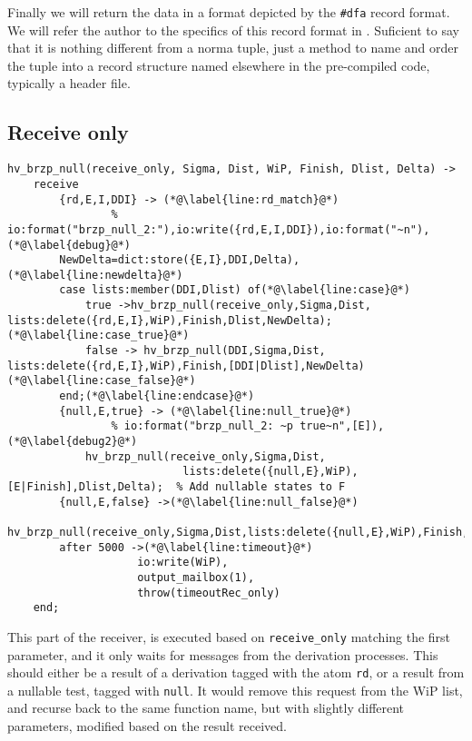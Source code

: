 Finally we will return the data in a format depicted by the
\texttt{\#dfa} record format. We will refer the author to the specifics
of this record format in \cite{Armstrong}. Suficient to say that it is
nothing different from a norma tuple, just a method to name and order
the tuple into a record structure named elsewhere in the pre-compiled
code, typically a header file.

\subsection{Receive only}
\label{sec:receive}

\begin{lstlisting}[name=hvp2]
%Receive only, nothing to derive
hv_brzp_null(receive_only, Sigma, Dist, WiP, Finish, Dlist, Delta) ->
	receive
		{rd,E,I,DDI} -> (*@\label{line:rd_match}@*)
                % io:format("brzp_null_2:"),io:write({rd,E,I,DDI}),io:format("~n"),(*@\label{debug}@*)
		NewDelta=dict:store({E,I},DDI,Delta),(*@\label{line:newdelta}@*)
		case lists:member(DDI,Dlist) of(*@\label{line:case}@*)
			true ->hv_brzp_null(receive_only,Sigma,Dist, lists:delete({rd,E,I},WiP),Finish,Dlist,NewDelta);(*@\label{line:case_true}@*)
			false -> hv_brzp_null(DDI,Sigma,Dist, lists:delete({rd,E,I},WiP),Finish,[DDI|Dlist],NewDelta)(*@\label{line:case_false}@*)
		end;(*@\label{line:endcase}@*)
		{null,E,true} -> (*@\label{line:null_true}@*)
                % io:format("brzp_null_2: ~p true~n",[E]), (*@\label{debug2}@*)
			hv_brzp_null(receive_only,Sigma,Dist,
                           lists:delete({null,E},WiP),[E|Finish],Dlist,Delta);	% Add nullable states to F
		{null,E,false} ->(*@\label{line:null_false}@*)
			hv_brzp_null(receive_only,Sigma,Dist,lists:delete({null,E},WiP),Finish,Dlist,Delta)
		after 5000 ->(*@\label{line:timeout}@*)
                    io:write(WiP),
                    output_mailbox(1),
                    throw(timeoutRec_only)
	end;
\end{lstlisting}

This part of the receiver, is executed based on \texttt{receive\_only}
matching the first parameter, and it only waits for messages from the
derivation processes. This should either be a result of a derivation
tagged with the atom \texttt{rd}, or a result from a nullable test,
tagged with \texttt{null}. It would remove this request from the WiP
list, and recurse back to the same function name, but with slightly
different parameters, modified based on the result received. 

